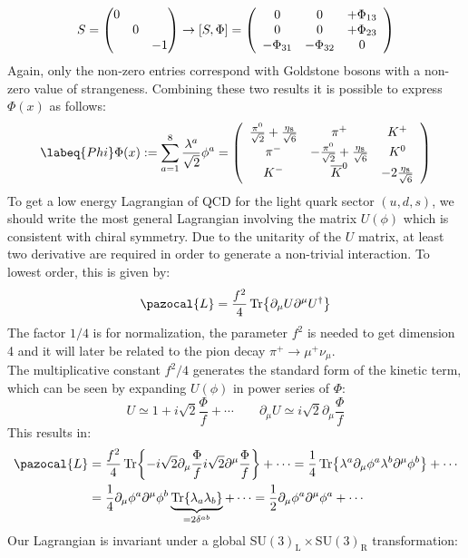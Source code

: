\documentclass[../main.tex]{subfiles}
\begin{document}
\[
S=\mqty(\dmat{0,0,-1})\to[S,\Phi]=\left(\begin{array}{ccc}
    0 & 0 & +\Phi_{13} \\
    0 & 0 & +\Phi_{23} \\
    -\Phi_{31} & -\Phi_{32} & 0
\end{array}\right)
\]
Again, only the non-zero entries correspond with Goldstone bosons with a non-zero value of strangeness.
Combining these two results it is possible to express $\Phi(x)$ as follows:
\begin{equation}
\labeq{Phi}
\Phi(x):=\sum_{a=1}^8\frac{\lambda^a}{\sqrt{2}}\phi^a=\left(\begin{array}{ccc}
    \frac{\pi^0}{\sqrt{2}}+\frac{\eta_8}{\sqrt{6}} & \pi^+ & K^+ \\
    \pi^- & -\frac{\pi^0}{\sqrt{2}}+\frac{\eta_8}{\sqrt{6}} & K^0 \\
    K^- & \overline{K}^0 & -2\frac{\eta_8}{\sqrt{6}}
\end{array}\right)
\end{equation}
To get a low energy Lagrangian of QCD for the light quark sector $(u, d, s)$, we should write the most general Lagrangian involving the matrix $U(\phi)$ which is consistent with chiral symmetry. Due to the unitarity of the $U$ matrix, at least two derivative are required in order to generate a non-trivial interaction. To lowest order, this is given by:
\[
\pazocal{L}=\frac{f^2}{4}\Tr{\partial_\mu U\partial^\mu U^\dagger}
\]
The factor $1/4$ is for normalization, the parameter $f^2$ is needed to get dimension 4 and it will later be related to the pion decay $\pi^+\to\mu^+\nu_\mu$.\\
The multiplicative constant $f^2/4$ generates the standard form of the kinetic term, which can be seen by expanding $U(\phi)$ in power series of $\Phi$:
\[
U\simeq1+i\sqrt{2}\frac{\Phi}{f}+\cdots \qquad \partial_\mu U\simeq i\sqrt{2}\partial_\mu\frac{\Phi}{f}
\]
This results in:
\[
\begin{aligned}
\pazocal{L}&=\frac{f^2}{4}\Tr{-i\sqrt{2}\partial_\mu\frac{\Phi}{f}i\sqrt{2}\partial^\mu\frac{\Phi}{f}}+\cdots=\frac{1}{4}\Tr{\lambda^a\partial_\mu\phi^a\lambda^b\partial^\mu\phi^b}+\cdots\\
&=\frac{1}{4}\partial_\mu\phi^a\partial^\mu\phi^b\underbrace{\Tr{\lambda_a\lambda_b}}_{=2\delta^{ab}}+\cdots=\frac{1}{2}\partial_\mu\phi^a\partial^\mu\phi^a+\cdots
\end{aligned}
\]
Our Lagrangian is invariant under a global SU$(3)_{\text{L}}\times$SU$(3)_{\text{R}}$ transformation:
\end{document}
